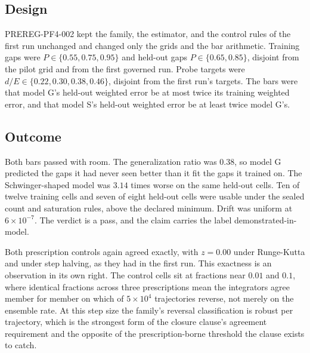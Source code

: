 \documentclass[aps,prd,reprint,nofootinbib,longbibliography]{revtex4-2}
\begin{document}
\subsection{Design}

PREREG-PF4-002 kept the family, the estimator, and the control rules of
the first run unchanged and changed only the grids and the bar
arithmetic.  Training gaps were $P \in \{0.55, 0.75, 0.95\}$ and
held-out gaps $P \in \{0.65, 0.85\}$, disjoint from the pilot grid and
from the first governed run.  Probe targets were
$d/E \in \{0.22, 0.30, 0.38, 0.46\}$, disjoint from the first run's
targets.  The bars were that model G's held-out weighted error be at
most twice its training weighted error, and that model S's held-out
weighted error be at least twice model G's.

\subsection{Outcome}

Both bars passed with room.  The generalization ratio was $0.38$, so
model G predicted the gaps it had never seen better than it fit the gaps
it trained on.  The Schwinger-shaped model was $3.14$ times worse on the
same held-out cells.  Ten of twelve training cells and seven of eight
held-out cells were usable under the sealed count and saturation rules,
above the declared minimum.  Drift was uniform at $6\times10^{-7}$.
The verdict is a pass, and the claim carries the label
demonstrated-in-model.

Both prescription controls again agreed exactly, with $z = 0.00$ under
Runge-Kutta and under step halving, as they had in the first run.  This
exactness is an observation in its own right.  The control cells sit at
fractions near $0.01$ and $0.1$, where identical fractions across three
prescriptions mean the integrators agree member for member on which of
$5\times10^{4}$ trajectories reverse, not merely on the ensemble rate.
At this step size the family's reversal classification is robust per
trajectory, which is the strongest form of the closure clause's
agreement requirement and the opposite of the prescription-borne
threshold the clause exists to catch.
\end{document}
